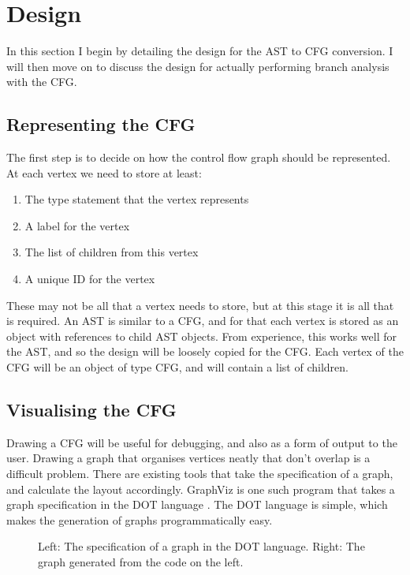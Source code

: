 \section{Design}

In this section I begin by detailing the design for the AST to CFG conversion. I will then move on to discuss the design for actually performing branch analysis with the CFG.

\subsection{Representing the CFG}

The first step is to decide on how the control flow graph should be represented. At each vertex we need to store at least:

\begin{enumerate}
\item The type statement that the vertex represents
\item A label for the vertex
\item The list of children from this vertex
\item A unique ID for the vertex
\end{enumerate}

These may not be all that a vertex needs to store, but at this stage it is all that is required. An AST is similar to a CFG, and for that each vertex is stored as an object with references to child AST objects. From experience, this works well for the AST, and so the design will be loosely copied for the CFG. Each vertex of the CFG will be an object of type CFG, and will contain a list of children.

\subsection{Visualising the CFG}

Drawing a CFG will be useful for debugging, and also as a form of output to the user. Drawing a graph that organises vertices neatly that don't overlap is a difficult problem. There are existing tools that take the specification of a graph, and calculate the layout accordingly. GraphViz is one such program \citep{GraphViz} that takes a graph specification in the DOT language \citep{DOT}. The DOT language is simple, which makes the generation of graphs programmatically easy. 

\begin{figure}
\begin{minipage}{0.44\textwidth}

\end{minipage}
\begin{minipage}{0.44\textwidth}
\centering
{}
\end{minipage}
\caption{Left: The specification of a graph in the DOT language. Right: The graph generated from the code on the left.}
\end{figure}


